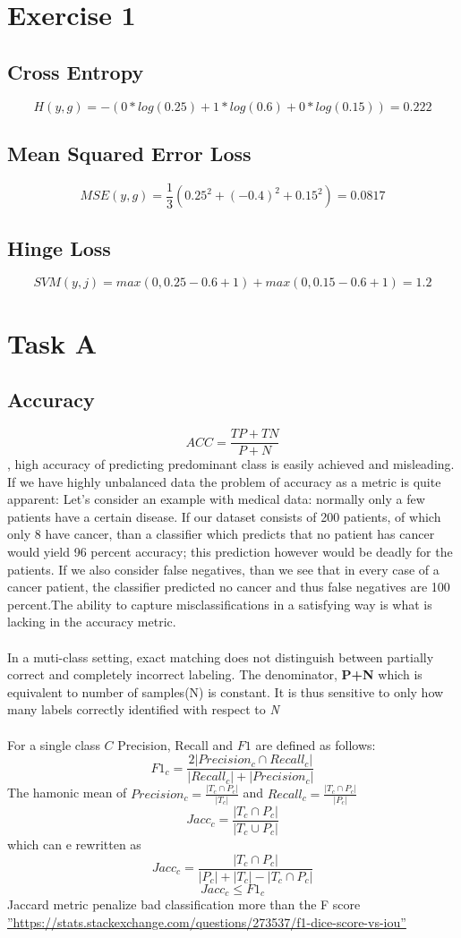 \documentclass[10pt]{article}
\begin{document}
\section{Exercise 1}
\subsection{Cross Entropy}
$$H(y,g)= -(0*log(0.25)+1*log(0.6)+0*log(0.15))=0.222$$
\subsection{Mean Squared Error Loss}
$$MSE(y,g)= \frac{1}{3}(0.25^2+(-0.4)^2+0.15^2)=0.0817$$
\subsection{Hinge Loss}
$$SVM(y,j)=max(0,0.25-0.6+1)+max(0,0.15-0.6+1)= 1.2$$

\section{Task A}
\subsection{Accuracy}
$$ACC = \frac{TP+TN}{P+N}$$, high accuracy of predicting predominant class is easily achieved and misleading.
If we have highly unbalanced data the problem of accuracy as a metric is quite apparent:
Let's consider an example with medical data: normally only a few patients have a certain disease.
If our dataset consists of 200 patients, of which only 8 have cancer, than a classifier which predicts
that no patient has cancer would yield 96 percent accuracy;
this prediction however would be deadly for the patients.
If we also consider false negatives, than we see that in every case of a cancer patient,
the classifier predicted no cancer and thus false negatives are 100 percent.The ability to  capture misclassifications in a satisfying way is what is lacking in the accuracy metric.
\paragraph{}
In a muti-class setting, exact matching does not distinguish between partially correct and completely incorrect labeling.
The denominator, \textbf{P+N} which is equivalent to number of samples(N) is constant. It is thus sensitive to only how many labels correctly identified with respect to \textit{N}
\paragraph{}
For a single class $C$ Precision, Recall and  $F1$ are defined as follows:
 $$F1_c =\frac{2|{Precision_c}\cap{Recall_c}|}{|Recall_c|+|Precision_c|}$$
 The hamonic mean of  $Precision_c =\frac{|{T_c}\cap{P_c}|}{|T_c|}$ and $Recall_c =\frac{|{T_c}\cap{P_c}|}{|P_c|}$
 $$Jacc_c =\frac{|{T_c}\cap{P_c}|}{|{T_c}\cup{P_c}|}$$
 which can e rewritten as
 $$Jacc_c =\frac{|{T_c}\cap{P_c}|}{|P_c|+|T_c|-|{T_c}\cap{P_c}|}$$
 $$Jacc_c\leq{F1_c}$$
Jaccard metric penalize bad classification more than the F score \hyperref[besteval]{''https://stats.stackexchange.com/questions/273537/f1-dice-score-vs-iou''}
\end{document}
